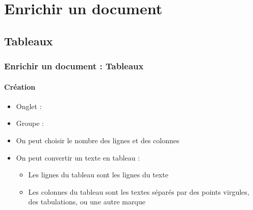 \documentclass[xcolor=table]{beamer}
\begin{document}
\section{Enrichir un document}

%

\subsection{Tableaux}


\begin{frame}
\frametitle{Enrichir un document : Tableaux}
\framesubtitle{Création}

\begin{minipage}{0.70\textwidth}
\begin{itemize}
	\item Onglet : 
	\item Groupe : 
	\item On peut choisir le nombre des lignes et des colonnes
	\item On peut convertir un texte en tableau :
	\begin{itemize}
		\item Les lignes du tableau sont les lignes du texte
		\item Les colonnes du tableau sont les textes séparés par des points virgules, des tabulations, ou une autre marque
	\end{itemize}
\end{itemize}
\end{minipage}
\begin{minipage}{0.28\textwidth}	
\end{minipage}

\end{frame}
\end{document}

